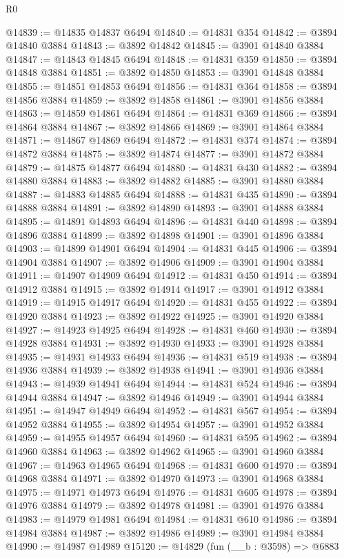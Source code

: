 \begin{lexlean}{R0}
\begin{coremodule}
@14839 := @14835 @14837 @6494
@14840 := @14831 @354
@14842 := @3894 @14840 @3884
@14843 := @3892 @14842
@14845 := @3901 @14840 @3884
@14847 := @14843 @14845 @6494
@14848 := @14831 @359
@14850 := @3894 @14848 @3884
@14851 := @3892 @14850
@14853 := @3901 @14848 @3884
@14855 := @14851 @14853 @6494
@14856 := @14831 @364
@14858 := @3894 @14856 @3884
@14859 := @3892 @14858
@14861 := @3901 @14856 @3884
@14863 := @14859 @14861 @6494
@14864 := @14831 @369
@14866 := @3894 @14864 @3884
@14867 := @3892 @14866
@14869 := @3901 @14864 @3884
@14871 := @14867 @14869 @6494
@14872 := @14831 @374
@14874 := @3894 @14872 @3884
@14875 := @3892 @14874
@14877 := @3901 @14872 @3884
@14879 := @14875 @14877 @6494
@14880 := @14831 @430
@14882 := @3894 @14880 @3884
@14883 := @3892 @14882
@14885 := @3901 @14880 @3884
@14887 := @14883 @14885 @6494
@14888 := @14831 @435
@14890 := @3894 @14888 @3884
@14891 := @3892 @14890
@14893 := @3901 @14888 @3884
@14895 := @14891 @14893 @6494
@14896 := @14831 @440
@14898 := @3894 @14896 @3884
@14899 := @3892 @14898
@14901 := @3901 @14896 @3884
@14903 := @14899 @14901 @6494
@14904 := @14831 @445
@14906 := @3894 @14904 @3884
@14907 := @3892 @14906
@14909 := @3901 @14904 @3884
@14911 := @14907 @14909 @6494
@14912 := @14831 @450
@14914 := @3894 @14912 @3884
@14915 := @3892 @14914
@14917 := @3901 @14912 @3884
@14919 := @14915 @14917 @6494
@14920 := @14831 @455
@14922 := @3894 @14920 @3884
@14923 := @3892 @14922
@14925 := @3901 @14920 @3884
@14927 := @14923 @14925 @6494
@14928 := @14831 @460
@14930 := @3894 @14928 @3884
@14931 := @3892 @14930
@14933 := @3901 @14928 @3884
@14935 := @14931 @14933 @6494
@14936 := @14831 @519
@14938 := @3894 @14936 @3884
@14939 := @3892 @14938
@14941 := @3901 @14936 @3884
@14943 := @14939 @14941 @6494
@14944 := @14831 @524
@14946 := @3894 @14944 @3884
@14947 := @3892 @14946
@14949 := @3901 @14944 @3884
@14951 := @14947 @14949 @6494
@14952 := @14831 @567
@14954 := @3894 @14952 @3884
@14955 := @3892 @14954
@14957 := @3901 @14952 @3884
@14959 := @14955 @14957 @6494
@14960 := @14831 @595
@14962 := @3894 @14960 @3884
@14963 := @3892 @14962
@14965 := @3901 @14960 @3884
@14967 := @14963 @14965 @6494
@14968 := @14831 @600
@14970 := @3894 @14968 @3884
@14971 := @3892 @14970
@14973 := @3901 @14968 @3884
@14975 := @14971 @14973 @6494
@14976 := @14831 @605
@14978 := @3894 @14976 @3884
@14979 := @3892 @14978
@14981 := @3901 @14976 @3884
@14983 := @14979 @14981 @6494
@14984 := @14831 @610
@14986 := @3894 @14984 @3884
@14987 := @3892 @14986
@14989 := @3901 @14984 @3884
@14990 := @14987 @14989
@15120 := @14829
    (fun (__b : @3598) =>
    @6883

\end{coremodule}
\end{lexlean}
